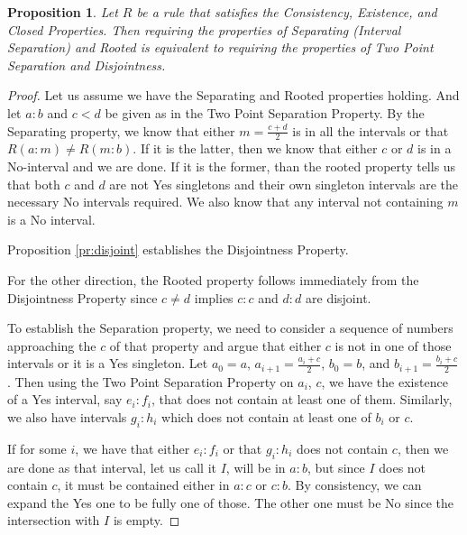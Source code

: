 \documentclass[12pt]{article}
\newtheorem{proposition}{Proposition}[subsection]
\theoremstyle{remark}
\begin{document}
\begin{proposition}
    Let $R$ be a rule that satisfies the Consistency, Existence, and Closed Properties. Then requiring the properties of Separating (Interval Separation) and Rooted is equivalent to requiring the properties of Two Point Separation and Disjointness. 
\end{proposition}

\begin{proof}
    Let us assume we have the Separating and Rooted properties holding. And let $a:b$ and $c\lt d$ be given as in the Two Point Separation Property. By the Separating property, we know that either $m =\frac{c+d}{2}$ is in all the intervals or that $R(a:m) \neq R(m:b)$. If it is the latter, then we know that either $c$ or $d$ is in a No-interval and we are done. If it is the former, than the rooted property tells us that both $c$ and $d$ are not Yes singletons and their own singleton intervals are the necessary No intervals required. We also know that any interval not containing $m$ is a No interval. 
    
    Proposition \ref{pr:disjoint} establishes the Disjointness Property. 

    For the other direction, the Rooted property follows immediately from the Disjointness Property since $c \neq d$ implies $c:c$ and $d:d$ are disjoint. 
    
    To establish the Separation property, we need to consider a sequence of numbers approaching the $c$ of that property and argue that either $c$ is not in one of those intervals or it is a Yes singleton. Let $a_0=a$, $a_{i+1} = \frac{a_i + c}{2}$, $b_0 = b$, and $b_{i+1} = \frac{b_i + c}{2}$. Then using the Two Point Separation Property on $a_i$, $c$, we have the existence of a Yes interval, say $e_i:f_i$, that does not contain at least one of them. Similarly, we also have intervals $g_i:h_i$ which does not contain at least one of $b_i$ or $c$. 
    
    If for some $i$,  we have that either $e_i:f_i$ or that $g_i:h_i$ does not contain $c$, then we are done as that interval, let us call it $I$,  will be in $a:b$, but since $I$ does not contain $c$, it must be contained either in $a:c$ or $c:b$. By consistency, we can expand the Yes one to be fully one of those. The other one must be No since the intersection with $I$ is empty. 
    

\end{proof}
\end{document}
